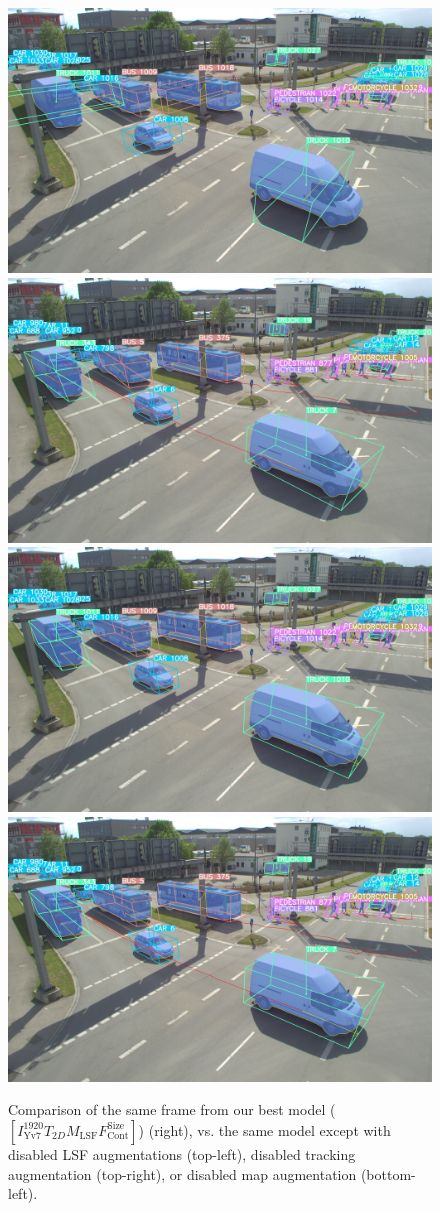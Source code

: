 \begin{figure}[htb]
    \centering
    \includegraphics[width=0.45\linewidth]{
        figures/selection/1651673054-274505919-s110-camera-basler-south2-8mm-nomaptrack}
    \includegraphics[width=0.45\linewidth]{
        figures/selection/1651673054-274505919-s110-camera-basler-south2-8mm-nomap} \\
    \includegraphics[width=0.45\linewidth]{
        figures/selection/1651673054-274505919-s110-camera-basler-south2-8mm-notrack}
    \includegraphics[width=0.45\linewidth]{
        figures/selection/1651673054-274505919-s110-camera-basler-south2-8mm}
    \caption{Comparison of the same frame from our best model ($\left[I^{1920}_\text{Yv7}T_{2D}M_\text{LSF}F_\text{Cont}^\text{Size}\right]$) (right), vs. the same model except with disabled LSF augmentations (top-left), disabled tracking augmentation (top-right), or disabled map augmentation (bottom-left).}
    \label{fig:qualitative-results-lsf-augments}
\end{figure}

